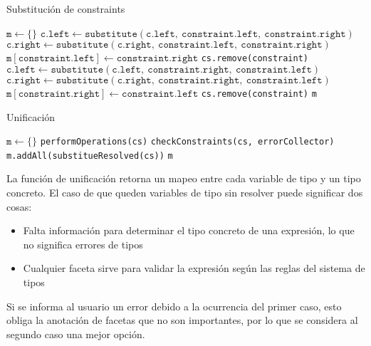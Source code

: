 \begin{algorithm}\captionsetup{labelsep=newline}
  \centering
  \caption{Substitución de constraints}
  \label{pseudosubst}
    \begin{algorithmic}[1]
          \State $\mathtt{m\gets \{\}}$
                \State $\mathtt{c.left\gets substitute(c.left,\ constraint.left,\ constraint.right)}$
                \State $\mathtt{c.right\gets substitute(c.right,\ constraint.left,\ constraint.right)}$
              \EndFor
              \State $\mathtt{m[constraint.left]\gets constraint.right}$
              \State \texttt{cs.remove(constraint)}
            \EndIf
                \State $\mathtt{c.left\gets substitute(c.left,\ constraint.right,\ constraint.left)}$
                \State $\mathtt{c.right\gets substitute(c.right,\ constraint.right,\ constraint.left)}$
              \EndFor
              \State $\mathtt{m[constraint.right]\gets constraint.left}$
              \State \texttt{cs.remove(constraint)}
            \EndIf
          \EndFor
          \State \Return \texttt{m}
      \EndFunction
    \end{algorithmic}
\end{algorithm}

\begin{algorithm}\captionsetup{labelsep=newline}
  \centering
  \caption{Unificación}
  \label{pseudouni}
    \begin{algorithmic}[1]
          \State $\mathtt{m\gets \{\}}$
            \State \texttt{performOperations(cs)}
            \State \texttt{checkConstraints(cs, errorCollector)}
            \State \texttt{m.addAll(substitueResolved(cs))}
          \EndWhile
          \State \Return \texttt{m}
      \EndFunction
    \end{algorithmic}
\end{algorithm}
\clearpage
La función de unificación retorna un mapeo entre cada variable de tipo y un tipo concreto. El caso de que queden variables de tipo sin resolver puede significar dos cosas:

\begin{itemize}
  \item Falta información para determinar el tipo concreto de una expresión, lo que no significa errores de tipos
  \item Cualquier faceta sirve para validar la expresión según las reglas del sistema de tipos
\end{itemize}

Si se informa al usuario un error debido a la ocurrencia del primer caso, esto obliga la anotación de facetas que no son importantes, por lo que se considera al segundo caso una mejor opción.
